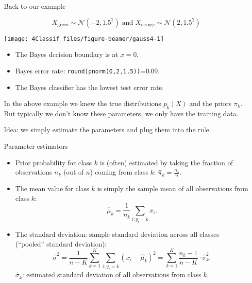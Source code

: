 \documentclass[10pt,ignorenonframetext,]{beamer}
\begin{document}
\begin{frame}[fragile]

\begin{block}{Back to our example}

\[X_{\text{green}}\sim \mathcal{N}(-2, 1.5^2) \text{ and }
X_{\text{orange}}\sim \mathcal{N}(2, 1.5^2) \]

\begin{center}\texttt{[image: 4Classif\_files/figure-beamer/gauss4-1]} \end{center}

\begin{itemize}
\item
  The Bayes decision boundary is at \(x=0\).
\item
  Bayes error rate: \texttt{round(pnorm(0,2,1.5))}=0.09.
\item
  The Bayes classifier has the lowest test error rate.
\end{itemize}

\end{block}

\end{frame}

\begin{frame}

\vspace{2mm}

In the above example we knew the true distributions \(p_k(X)\) and the
priors \(\pi_k\). But typically we don't know these parameters, we only
have the training data.

Idea: we simply estimate the parameters and plug them into the rule.

\end{frame}

\begin{frame}

\begin{block}{Parameter estimators}

\vspace{2mm}

\begin{itemize}
\item
  Prior probability for class \(k\) is (often) estimated by taking the
  fraction of observations \(n_k\) (out of \(n\)) coming from class
  \(k\): \(\hat{\pi}_k = \frac{n_k}{n}.\)
\item
  The mean value for class \(k\) is simply the sample mean of all
  observations from class \(k\):
  \[\hat{\mu}_k = \frac{1}{n_k}\sum_{i:y_i=k} x_i.\]
\item
  The standard deviation: sample standard deviation across all classes
  (``pooled'' standard deviation):
  \[\hat{\sigma}^2=\frac{1}{n-K}\sum_{k=1}^K \sum_{i: y_i=k} (x_i-\hat{\mu}_k)^2 = \sum_{k=1}^K \frac{n_k - 1}{n - K} \cdot \hat{\sigma}_k^2.\]
  \(\hat{\sigma}_k\): estimated standard deviation of all observations
  from class \(k\).
\end{itemize}

\end{block}

\end{frame}
\end{document}
